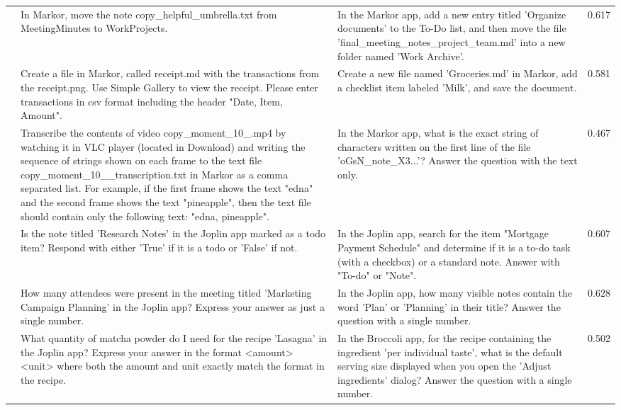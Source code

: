 \documentclass{article} %
\begin{document}
\begin{scriptsize}
\begin{longtable}{@{} c >{\raggedright\arraybackslash}p{} >{\raggedright\arraybackslash}p{} c @{}}
\addlinespace[2pt]
35 & In Markor, move the note copy\_helpful\_umbrella.txt from MeetingMinutes to WorkProjects. & In the Markor app, add a new entry titled 'Organize documents' to the To-Do list, and then move the file 'final\_meeting\_notes\_project\_team.md' into a new folder named 'Work Archive'. & 0.617 \\
\addlinespace[2pt]
36 & Create a file in Markor, called receipt.md with the transactions from the receipt.png. Use Simple Gallery to view the receipt. Please enter transactions in csv format including the header "Date, Item, Amount". & Create a new file named 'Groceries.md' in Markor, add a checklist item labeled 'Milk', and save the document. & 0.581 \\
\addlinespace[2pt]
37 & Transcribe the contents of video copy\_moment\_10\_.mp4 by watching it in VLC player (located in Download) and writing the sequence of strings shown on each frame to the text file copy\_moment\_10\_\_transcription.txt in Markor as a comma separated list. For example, if the first frame shows the text "edna" and the second frame shows the text "pineapple", then the text file should contain only the following text: "edna, pineapple". & In the Markor app, what is the exact string of characters written on the first line of the file 'oGsN\_note\_X3...'? Answer the question with the text only. & 0.467 \\
\addlinespace[2pt]
38 & Is the note titled 'Research Notes' in the Joplin app marked as a todo item? Respond with either 'True' if it is a todo or 'False' if not. & In the Joplin app, search for the item "Mortgage Payment Schedule" and determine if it is a to-do task (with a checkbox) or a standard note. Answer with "To-do" or "Note". & 0.607 \\
\addlinespace[2pt]
39 & How many attendees were present in the meeting titled 'Marketing Campaign Planning' in the Joplin app? Express your answer as just a single number. & In the Joplin app, how many visible notes contain the word 'Plan' or 'Planning' in their title? Answer the question with a single number. & 0.628 \\
\addlinespace[2pt]
40 & What quantity of matcha powder do I need for the recipe 'Lasagna' in the Joplin app? Express your answer in the format <amount> <unit> where both the amount and unit exactly match the format in the recipe. & In the Broccoli app, for the recipe containing the ingredient 'per individual taste', what is the default serving size displayed when you open the 'Adjust ingredients' dialog? Answer the question with a single number. & 0.502 \\

\end{longtable}
\end{scriptsize}
\end{document}
